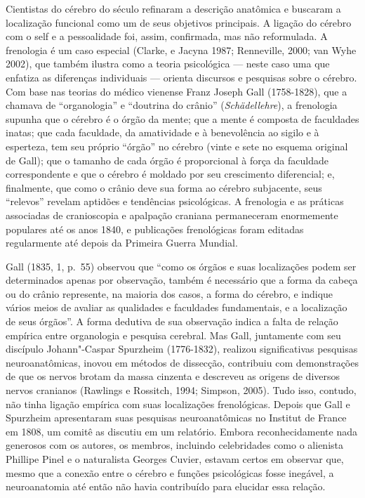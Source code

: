 Cientistas do cérebro do século  refinaram a descrição anatômica e
buscaram a localização funcional como um de seus objetivos principais. A
ligação do cérebro com o self e a pessoalidade foi, assim, confirmada,
mas não reformulada. A frenologia é um caso especial (Clarke, e Jacyna
1987; Renneville, 2000; van Wyhe 2002), que também ilustra como a teoria
psicológica --- neste caso uma que enfatiza as diferenças individuais
--- orienta discursos e pesquisas sobre o cérebro. Com base nas teorias
do médico vienense Franz Joseph Gall (1758-1828), que a chamava de
``organologia'' e ``doutrina do crânio'' (\emph{Schädellehre}), a
frenologia supunha que o cérebro é o órgão da mente; que a mente é
composta de faculdades inatas; que cada faculdade, da amatividade e à
benevolência ao sigilo e à esperteza, tem seu próprio ``órgão'' no
cérebro (vinte e sete no esquema original de Gall); que o tamanho de
cada órgão é proporcional à força da faculdade correspondente e que o
cérebro é moldado por seu crescimento diferencial; e, finalmente, que
como o crânio deve sua forma ao cérebro subjacente, seus ``relevos''
revelam aptidões e tendências psicológicas. A frenologia e as práticas
associadas de cranioscopia e apalpação craniana permaneceram enormemente
populares até os anos 1840, e publicações frenológicas foram editadas
regularmente até depois da Primeira Guerra Mundial.

Gall (1835, 1, p.~55) observou que ``como os órgãos e suas localizações
podem ser determinados apenas por observação, também é necessário que a
forma da cabeça ou do crânio represente, na maioria dos casos, a forma
do cérebro, e indique vários meios de avaliar as qualidades e faculdades
fundamentais, e a localização de seus órgãos''. A forma dedutiva de sua
observação indica a falta de relação empírica entre organologia e
pesquisa cerebral. Mas Gall, juntamente com seu discípulo Johann"-Caspar
Spurzheim (1776-1832), realizou significativas pesquisas
neuroanatômicas, inovou em métodos de dissecção, contribuiu com
demonstrações de que os nervos brotam da massa cinzenta e descreveu as
origens de diversos nervos cranianos (Rawlings e Rossitch, 1994;
Simpson, 2005). Tudo isso, contudo, não tinha ligação empírica com suas
localizações frenológicas. Depois que Gall e Spurzheim apresentaram suas
pesquisas neuroanatômicas no Institut de France em 1808, um comitê as
discutiu em um relatório. Embora reconhecidamente nada generosos com os
autores, os membros, incluindo celebridades como o alienista Phillipe
Pinel e o naturalista Georges Cuvier, estavam certos em observar que,
mesmo que a conexão entre o cérebro e funções psicológicas fosse
inegável, a neuroanatomia até então não havia contribuído para elucidar
essa relação.

